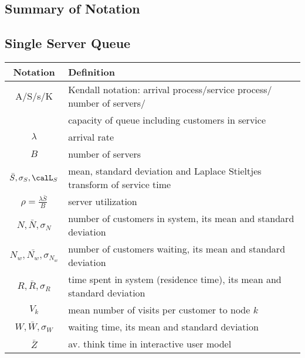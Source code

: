 \subsection{Summary of Notation}
%
\subsection*{Single Server Queue}
  \begin{center}
\begin{tabular}{cl} \hline
  Notation & Definition\\ \hline
  A/S/s/K&Kendall notation: arrival process/service process/
  number of servers/ \\ &capacity of queue
  including customers in service\\
  $\lambda$ & arrival rate\\
  $B$&number of servers\\
  $\bar{S}, \sigma_S, \calL_S$ & mean, standard deviation and Laplace Stieltjes transform of service time \\
  $\rho=\frac{\lambda \bar{S}}{B}$ & server utilization\\
  $N,\bar{N},\sigma_N$ & number of customers in system, its mean and standard deviation\\
  $N_w,\bar{N_w},\sigma_{N_w}$ & number of customers waiting, its mean and standard deviation\\
  $R,\bar{R},\sigma_R$ & time spent in system (residence time), its mean and standard deviation\\
   $V_k$&mean number of visits per customer to node $k$\\
   $W,\bar{W},\sigma_W$ & waiting time, its mean and standard deviation\\
   $\bar{Z}$&av. think time in interactive user model\\
  \hline
\end{tabular}
\end{center}
